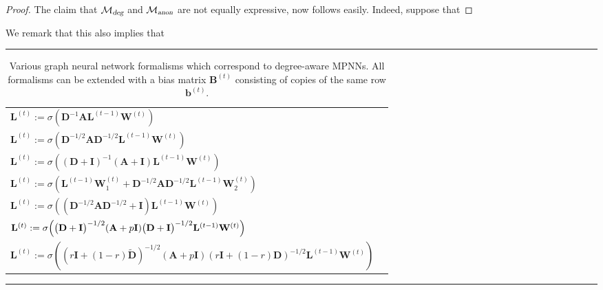 \begin{proof}
The claim that $\mathcal{M}_{\textsl{deg}}$ and  $\mathcal{M}_{\textsl{anon}}$ are not equally expressive, now follows easily. Indeed, suppose that 

\end{proof}
We remark that this also implies that 

\begin{table}[]
\hrule
\hspace*{1ex}
 \caption{Various graph neural network formalisms which correspond to degree-aware MPNNs. All formalisms can be extended with a bias matrix $\mathbf{B}^{(t)}$ consisting of copies of the same row $\mathbf{b}^{(t)}$.}
    \label{tab:dMPNNs}
    \centering
    \begin{tabular}{ll}
 $\mathbf{L}^{(t)}:=\sigma\left(\mathbf{D}^{-1}\mathbf{A}\mathbf{L}^{(t-1)}\mathbf{W}^{(t)}\right)$ &\cite{} \\
$
\mathbf{L}^{(t)}:=\sigma\left(\mathbf{D}^{-1/2}\mathbf{A}\mathbf{D}^{-1/2}\mathbf{L}^{(t-1)}\mathbf{W}^{(t)}\right)$&\cite{} \\
$
\mathbf{L}^{(t)}:=\sigma\left((\mathbf{D}+\mathbf{I})^{-1}(\mathbf{A}+\mathbf{I})\mathbf{L}^{(t-1)}\mathbf{W}^{(t)}\right)$&\cite{} \\
$\mathbf{L}^{(t)}:=\sigma\left(\mathbf{L}^{(t-1)}\mathbf{W}_1^{(t)}+\mathbf{D}^{-1/2}\mathbf{A}\mathbf{D}^{-1/2}\mathbf{L}^{(t-1)}\mathbf{W}_2^{(t)}\right)$&\cite{} \\
$
\mathbf{L}^{(t)}:=\sigma\left((\mathbf{D}^{-1/2}\mathbf{A}\mathbf{D}^{-1/2}+\mathbf{I})\mathbf{L}^{(t-1)}\mathbf{W}^{(t)}\right)$ &\cite{} \\
$
\mathbf{L}^{(t)}:=\sigma\Bigl(\bigl(\mathbf{D}+\mathbf{I}\bigr)^{-1/2} (\mathbf{A}+p\mathbf{I})\bigl(\mathbf{D}+\mathbf{I}\bigr)^{-1/2} \mathbf{L}^{(t-1)}\mathbf{W}^{(t)}\Bigr)
$& \cite{kipf-loose} \\
$\mathbf{L}^{(t)}:=\sigma\left((r\mathbf{I}+(1-r)\tilde{\mathbf{D}})^{-1/2}(\mathbf{A}+p\mathbf{I})(r\mathbf{I}+(1-r)\mathbf{D})^{-1/2}\mathbf{L}^{(t-1)}\mathbf{W}^{(t)}\right)$ & \cite{DBLP:journals/corr/abs-1905-03046} 
    \end{tabular}
\hspace*{1ex}
\hrule
\end{table}


